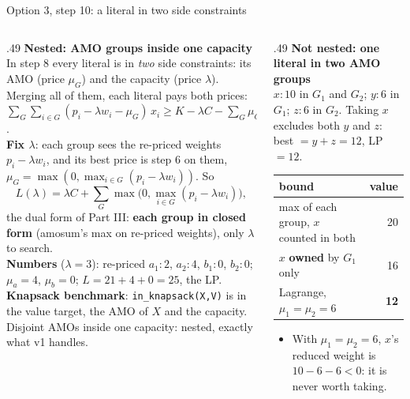 \documentclass[aspectratio=169,11pt]{beamer}
\begin{document}
\begin{frame}{Option 3, step 10: a literal in two side constraints}
\scriptsize
\begin{columns}[T]
\begin{column}{.49\textwidth}
\textcolor{acc}{\textbf{Nested: AMO groups inside one capacity}}\\[1mm]
In step 8 every literal is in \emph{two} side constraints: its AMO (price $\mu_G$) and the capacity (price $\lambda$).
Merging all of them, each literal pays both prices:
$\sum_G\sum_{i\in G} (p_i - \lambda w_i - \mu_G)\,x_i \ge K - \lambda C - \sum_G \mu_G$.\\[1mm]
\textbf{Fix $\lambda$}: each group sees the re-priced weights $p_i - \lambda w_i$, and its best price is step 6 on them,
$\mu_G = \max(0, \max_{i\in G}(p_i - \lambda w_i))$. So
\[
L(\lambda) = \lambda C + \textstyle\sum_G \max\big(0, \max_{i\in G}(p_i - \lambda w_i)\big),
\]
the dual form of Part III: \textbf{each group in closed form} (amosum's max on re-priced weights), only $\lambda$ to search.\\[1mm]
\textbf{Numbers} ($\lambda = 3$): re-priced $a_1{:}2$, $a_2{:}4$, $b_1{:}0$, $b_2{:}0$; $\mu_a = 4$, $\mu_b = 0$;
$L = 21 + 4 + 0 = 25$, the LP.\\[1mm]
\textbf{Knapsack benchmark}: \texttt{in\_knapsack(X,V)} is in the value target, the AMO of $X$ and the capacity.
Disjoint AMOs inside one capacity: nested, exactly what v1 handles.
\end{column}
\begin{column}{.49\textwidth}
\textcolor{acc}{\textbf{Not nested: one literal in two AMO groups}}\\[1mm]
$x{:}10$ in $G_1$ and $G_2$; $y{:}6$ in $G_1$; $z{:}6$ in $G_2$. Taking $x$ excludes both $y$ and $z$:
best $= y + z = 12$, LP $= 12$.
\begin{center}
\begin{tabular}{lr}\toprule
bound & value\\\midrule
max of each group, $x$ counted in both & 20\\
$x$ \textbf{owned} by $G_1$ only & 16\\
Lagrange, $\mu_1 = \mu_2 = 6$ & \textbf{12}\\\bottomrule
\end{tabular}
\end{center}
\begin{itemize}\setlength\itemsep{1pt}
\item With $\mu_1 = \mu_2 = 6$, $x$'s reduced weight is $10 - 6 - 6 < 0$: it is never worth taking.

\end{itemize}
\end{column}
\end{columns}
\end{frame}
\end{document}
